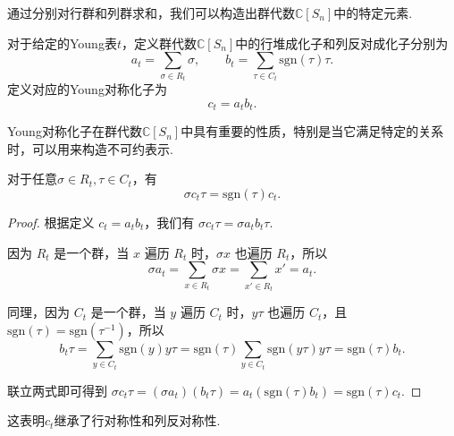 通过分别对行群和列群求和，我们可以构造出群代数$\mathbb{C}[S_n]$中的特定元素.

\begin{definition}[Young对称化子]
    对于给定的Young表$t$，定义群代数$\mathbb{C}[S_n]$中的行堆成化子和列反对成化子分别为
    \begin{equation*}
        a_t = \sum_{\sigma \in R_t} \sigma, \qquad b_t = \sum_{\tau \in C_t} \mathrm{sgn}(\tau) \tau.
    \end{equation*}
    定义对应的Young对称化子为 
    \begin{equation*}
        c_t = a_t b_t.
    \end{equation*}
\end{definition}

Young对称化子在群代数$\mathbb{C}[S_n]$中具有重要的性质，特别是当它满足特定的关系时，可以用来构造不可约表示.

\begin{lemma}{\label{lem:von_neumann}}
    对于任意$\sigma\in R_t,\tau\in C_t$，有
    \begin{equation*}
        \sigma c_t \tau = \mathrm{sgn}(\tau) c_t.
    \end{equation*}
\end{lemma}
\begin{proof}
    根据定义 $c_t = a_t b_t$，我们有 $\sigma c_t \tau = \sigma a_t b_t \tau$.
    
    因为 $R_t$ 是一个群，当 $x$ 遍历 $R_t$ 时，$\sigma x$ 也遍历 $R_t$，所以
    \begin{equation*}
        \sigma a_t = \sum_{x \in R_t} \sigma x = \sum_{x' \in R_t} x' = a_t.
    \end{equation*}
    
    同理，因为 $C_t$ 是一个群，当 $y$ 遍历 $C_t$ 时，$y\tau$ 也遍历 $C_t$，且 $\mathrm{sgn}(\tau) = \mathrm{sgn}(\tau^{-1})$，所以
    \begin{equation*}
        b_t \tau = \sum_{y \in C_t} \mathrm{sgn}(y) y \tau = \mathrm{sgn}(\tau) \sum_{y \in C_t} \mathrm{sgn}(y\tau) y\tau = \mathrm{sgn}(\tau) b_t.
    \end{equation*}
    
    联立两式即可得到 $\sigma c_t \tau = (\sigma a_t) (b_t \tau) = a_t (\mathrm{sgn}(\tau) b_t) = \mathrm{sgn}(\tau) c_t$.
\end{proof}
这表明$c_t$继承了行对称性和列反对称性.

